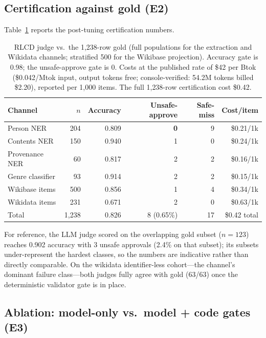 \documentclass{llncs}
\begin{document}
\subsection{Certification against gold (E2)}
\label{sec:eval:e2}

Table~\ref{tab:cert} reports the post-tuning certification numbers.

\begin{table}[t]
\centering
\small
\begin{tabular}{lrrrrr}
\toprule
Channel & $n$ & Accuracy & Unsafe-approve & Safe-miss & Cost/item \\
\midrule
Person NER & 204 & 0.809 & \textbf{0} & 9 & \$0.21/1k \\
Contents NER & 150 & 0.940 & 1 & 0 & \$0.24/1k \\
Provenance NER & 60 & 0.817 & 2 & 2 & \$0.16/1k \\
Genre classifier & 93 & 0.914 & 2 & 2 & \$0.15/1k \\
Wikibase items & 500 & 0.856 & 1 & 4 & \$0.34/1k \\
Wikidata items & 231 & 0.671 & 2 & 0 & \$0.63/1k \\
\midrule
Total & 1{,}238 & 0.826 & 8 (0.65\%) & 17 & \$0.42 total \\
\bottomrule
\end{tabular}
\caption{RLCD judge vs.\ the 1{,}238-row gold (full populations for the
extraction and Wikidata channels; stratified 500 for the Wikibase
projection). Accuracy gate is 0.98; the unsafe-approve gate is 0. Costs at
the published rate of \$42 per Btok (\$0.042/Mtok input, output tokens
free; console-verified: 54.2M tokens billed \$2.20), reported per 1{,}000
items. The full 1{,}238-row certification cost \$0.42.}
\label{tab:cert}
\end{table}

For reference, the LLM judge scored on the overlapping gold subset
($n{=}123$) reaches 0.902 accuracy with 3 unsafe approvals (2.4\% on that
subset); its subsets under-represent the hardest classes, so the numbers
are indicative rather than directly comparable. On the wikidata
identifier-less cohort---the channel's dominant failure class---both
judges fully agree with gold (63/63) once the deterministic validator gate
is in place.

\subsection{Ablation: model-only vs.\ model + code gates (E3)}
\label{sec:eval:ablation}
\end{document}
